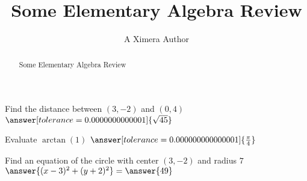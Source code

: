 \documentclass{ximera}
\title{Some Elementary Algebra Review}
\author{A Ximera Author}
\begin{document}
\begin{abstract}
Some Elementary Algebra Review
\end{abstract}

\maketitle

\begin{problem}
   Find the distance between $(3, -2)$ and $(0, 4)$ $\answer[tolerance=0.0000000000001]{\sqrt{45}}$
\end{problem}

\begin{problem}
   Evaluate $\arctan(1)$ $\answer[tolerance=0.000000000000001]{\frac{\pi}{4}}$
\end{problem}

\begin{problem}
   Find an equation of the circle with center $(3, -2)$ and radius $7$ $\answer{(x - 3)^2 + (y + 2)^2} = \answer{49}$
\end{problem}
\end{document}

